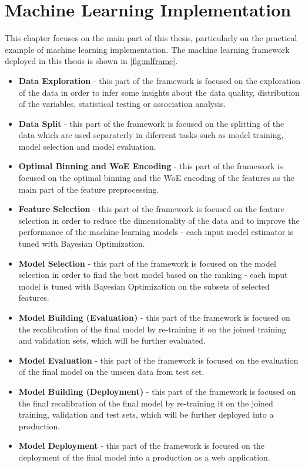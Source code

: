 \chapter{Machine Learning Implementation}
\label{chap:four}
This chapter focuses on the main part of this thesis, particularly on the practical example of machine learning implementation. The machine learning framework deployed in this thesis is shown in \autoref{fig:mlframe}.
\begin{itemize}\setlength\itemsep{0em}
    \item \textbf{Data Exploration} - this part of the framework is focused on the exploration of the data in order to infer some insights about the data quality, distribution of the variables, statistical testing or association analysis.
    \item \textbf{Data Split} - this part of the framework is focused on the splitting of the data which are used separaterly in diferrent tasks such as model training, model selection and model evaluation.
    \item \textbf{Optimal Binning and WoE Encoding} - this part of the framework is focused on the optimal binning and the WoE encoding of the features as the main part of the feature preprocessing.
    \item \textbf{Feature Selection} - this part of the framework is focused on the feature selection in order to reduce the dimensionality of the data and to improve the performance of the machine learning models - each input model estimator is tuned with Bayesian Optimization.
    \item \textbf{Model Selection} - this part of the framework is focused on the model selection in order to find the best model based on the ranking - each input model is tuned with Bayesian Optimization on the subsets of selected features.
    \item \textbf{Model Building (Evaluation)} - this part of the framework is focused on the recalibration of the final model by re-training it on the joined training and validation sets, which will be further evaluated.
    \item \textbf{Model Evaluation} - this part of the framework is focused on the evaluation of the final model on the unseen data from test set.
    \item \textbf{Model Building (Deployment)} - this part of the framework is focused on the final recalibration of the final model by re-training it on the joined training, validation and test sets, which will be further deployed into a production.
    \item \textbf{Model Deployment} - this part of the framework is focused on the deployment of the final model into a production as a web application.
\end{itemize}

